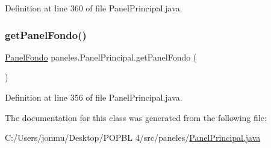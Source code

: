 Definition at line 360 of file Panel\+Principal.\+java.

\mbox{\label{classpaneles_1_1_panel_principal_ab8efee7c290494ba31d026c47dbbcefb}} 
\subsubsection{\texorpdfstring{get\+Panel\+Fondo()}{getPanelFondo()}}
{\footnotesize\ttfamily \mbox{\hyperlink{classpaneles_1_1_panel_fondo}{Panel\+Fondo}} paneles.\+Panel\+Principal.\+get\+Panel\+Fondo (\begin{DoxyParamCaption}{ }\end{DoxyParamCaption})}



Definition at line 356 of file Panel\+Principal.\+java.



The documentation for this class was generated from the following file\+:\begin{DoxyCompactItemize}
\item 
C\+:/\+Users/jonmu/\+Desktop/\+P\+O\+P\+B\+L 4/src/paneles/\mbox{\hyperlink{_panel_principal_8java}{Panel\+Principal.\+java}}\end{DoxyCompactItemize}
